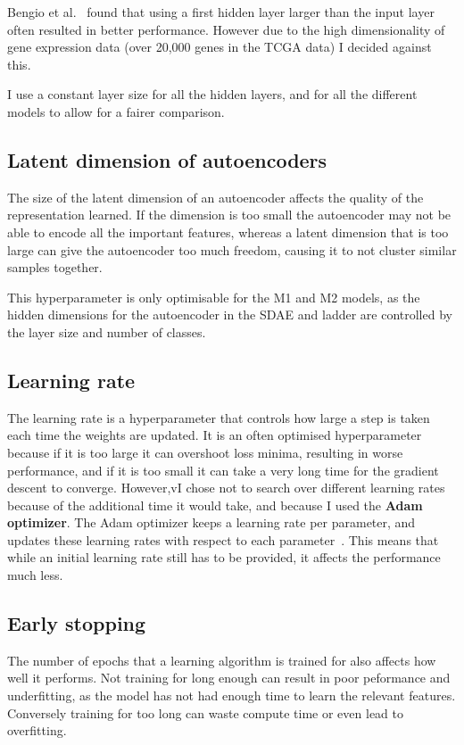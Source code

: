 Bengio et al.~\cite{DBLP:series/lncs/Bengio12} found that using a first hidden layer larger than the input layer often resulted in 
better performance. However due to the high dimensionality of gene expression data (over 20,000 genes in the TCGA data) I decided against 
this. 

I use a constant layer size for all the hidden layers, and for all the different models to allow for a fairer
comparison.

\subsection{Latent dimension of autoencoders}
The size of the latent dimension of an autoencoder affects the quality of the representation learned. If the dimension is too small the 
autoencoder may not be able to encode all the important features, whereas a latent dimension that is too large can give the autoencoder 
too much freedom, causing it to not cluster similar samples together.

This hyperparameter is only optimisable for the M1 and M2 models, as the hidden dimensions for the autoencoder in the SDAE and ladder 
are controlled by the layer size and number of classes.

\subsection{Learning rate}
The learning rate is a hyperparameter that controls how large a step is taken each time the weights are updated. It is an often
optimised hyperparameter because if it is too large it can overshoot loss minima, resulting in worse performance, and if it is too 
small it can take a very long time for the gradient descent to converge. However,vI chose not to search over different learning 
rates because of the additional time it would take, and because I used the \textbf{Adam optimizer}. The Adam optimizer keeps a 
learning rate per parameter, and updates these learning rates with respect to each 
parameter~\cite{DBLP:journals/corr/KingmaB14}. This means that while an initial learning rate still has to be provided, it affects the 
performance much less.

\subsection{Early stopping}
The number of epochs that a learning algorithm is trained for also affects how well it performs. Not training for long enough can result in
poor peformance and underfitting, as the model has not had enough time to learn the relevant features. Conversely training for too long can
waste compute time or even lead to overfitting.

